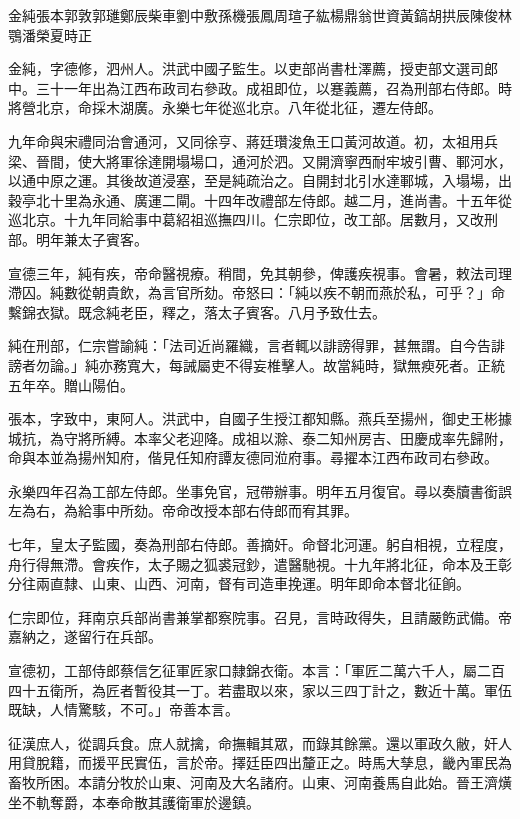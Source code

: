 
\begin{pinyinscope}
金純張本郭敦郭璡鄭辰柴車劉中敷孫機張鳳周瑄子紘楊鼎翁世資黃鎬胡拱辰陳俊林鶚潘榮夏時正

金純，字德修，泗州人。洪武中國子監生。以吏部尚書杜澤薦，授吏部文選司郎中。三十一年出為江西布政司右參政。成祖即位，以蹇義薦，召為刑部右侍郎。時將營北京，命採木湖廣。永樂七年從巡北京。八年從北征，遷左侍郎。

九年命與宋禮同治會通河，又同徐亨、蔣廷瓚浚魚王口黃河故道。初，太祖用兵梁、晉間，使大將軍徐達開塌場口，通河於泗。又開濟寧西耐牢坡引曹、鄆河水，以通中原之運。其後故道浸塞，至是純疏治之。自開封北引水達鄆城，入塌場，出穀亭北十里為永通、廣運二閘。十四年改禮部左侍郎。越二月，進尚書。十五年從巡北京。十九年同給事中葛紹祖巡撫四川。仁宗即位，改工部。居數月，又改刑部。明年兼太子賓客。

宣德三年，純有疾，帝命醫視療。稍間，免其朝參，俾護疾視事。會暑，敕法司理滯囚。純數從朝貴飲，為言官所劾。帝怒曰：「純以疾不朝而燕於私，可乎？」命繫錦衣獄。既念純老臣，釋之，落太子賓客。八月予致仕去。

純在刑部，仁宗嘗諭純：「法司近尚羅織，言者輒以誹謗得罪，甚無謂。自今告誹謗者勿論。」純亦務寬大，每誡屬吏不得妄椎擊人。故當純時，獄無瘐死者。正統五年卒。贈山陽伯。

張本，字致中，東阿人。洪武中，自國子生授江都知縣。燕兵至揚州，御史王彬據城抗，為守將所縛。本率父老迎降。成祖以滁、泰二知州房吉、田慶成率先歸附，命與本並為揚州知府，偕見任知府譚友德同涖府事。尋擢本江西布政司右參政。

永樂四年召為工部左侍郎。坐事免官，冠帶辦事。明年五月復官。尋以奏牘書銜誤左為右，為給事中所劾。帝命改授本部右侍郎而宥其罪。

七年，皇太子監國，奏為刑部右侍郎。善摘奸。命督北河運。躬自相視，立程度，舟行得無滯。會疾作，太子賜之狐裘冠鈔，遣醫馳視。十九年將北征，命本及王彰分往兩直隸、山東、山西、河南，督有司造車挽運。明年即命本督北征餉。

仁宗即位，拜南京兵部尚書兼掌都察院事。召見，言時政得失，且請嚴飭武備。帝嘉納之，遂留行在兵部。

宣德初，工部侍郎蔡信乞征軍匠家口隸錦衣衛。本言：「軍匠二萬六千人，屬二百四十五衛所，為匠者暫役其一丁。若盡取以來，家以三四丁計之，數近十萬。軍伍既缺，人情驚駭，不可。」帝善本言。

征漢庶人，從調兵食。庶人就擒，命撫輯其眾，而錄其餘黨。還以軍政久敝，奸人用貸脫籍，而援平民實伍，言於帝。擇廷臣四出釐正之。時馬大孳息，畿內軍民為畜牧所困。本請分牧於山東、河南及大名諸府。山東、河南養馬自此始。晉王濟熿坐不軌奪爵，本奉命散其護衛軍於邊鎮。


\end{pinyinscope}
